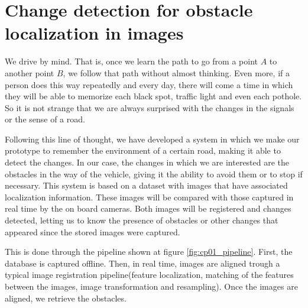 
\graphicspath{{./images/chapter01/bmps/}{./images/chapter01/vects/}{./images/chapter01/}}

\chapter{Change detection for obstacle localization in images}\label{ch:chapter01}

We drive by mind. That is, once we learn the path to go from a point $A$ to another point $B$, we follow that path without almost thinking. Even more, if a person does this way repeatedly and every day, there will come a time in which they will be able to memorize each black spot, traffic light and even each pothole. So it is not strange that we are always surprised with the changes in the signals or the sense of a road.

Following this line of thought, we have developed a system in which we make our prototype to remember the environment of a certain road, making it able to detect the changes. In our case, the changes in which we are interested are the obstacles in the way of the vehicle, giving it the ability to avoid them or to stop if necessary. This system is based on a dataset with images that have associated localization information. These images will be compared with those captured in real time by the on board cameras. Both images will be registered and changes detected, letting us to know the presence of obstacles or other changes that appeared since the stored images were captured.

This is done through the pipeline shown at figure \ref{fig:cp01_pipeline}. First, the database is captured offline. Then, in real time, images are aligned trough a typical image registration pipeline(feature localization, matching of the features between the images, image transformation and resampling). Once the images are aligned, we retrieve the obstacles.


